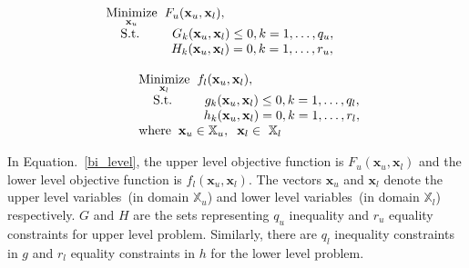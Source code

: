 \begin{equation}
\begin{array}{lr}
 \underset{\mathbf{x}_u}{\text{Minimize}}\hspace{2mm} F_u(\mathbf{x}_u, \mathbf{ x}_l), \hspace{2mm} \\ 
 \hspace{4mm}\text{S.t.}\hspace{9mm}G_k(\mathbf{x}_u, \mathbf{ x}_l) \le 0, k=1,\ldots,q_u, \hspace{2mm}\\
\hspace{18mm}H_k(\mathbf{x}_u, \mathbf{ x}_l) = 0, k=1,\ldots,r_u, \hspace{2mm}\\
\text{ }\\
\hspace{9mm} \underset{\mathbf{x}_l}{\text{Minimize}}\hspace{2mm} f_l(\mathbf{x}_u, \mathbf{ x}_l), \\
 \hspace{9mm} \hspace{4mm}\text{S.t.}\hspace{9mm}g_k(\mathbf{x}_u, \mathbf{ x}_l) \le 0, k=1,\ldots,q_l, \hspace{2mm}\\
\hspace{9mm}\hspace{18mm}h_k(\mathbf{x}_u, \mathbf{ x}_l) = 0, k=1,\ldots,r_l, \hspace{1mm}\\
\hspace{9mm} \text {where}\hspace{2mm}{\mathbf{x}_u \in \mathbb{X}_u}, \hspace{2mm}{\mathbf{x}_l \in \ \mathbb{X}_l}\\
\end{array}
\label{bi_level}
\end{equation}


In Equation.~\ref{bi_level}, the upper level objective function is $F_u(\mathbf{x}_u, \mathbf{ x}_l)$ and the lower level objective function is $f_l(\mathbf{x}_u, \mathbf{ x}_l)$. The vectors $\mathbf{x}_u$ and $\mathbf{x}_l$ denote the upper level variables~(in domain  $\mathbb{X}_u$) and lower level variables~(in domain $\mathbb{X}_l$) respectively. $G$ and $H$ are the sets representing $q_u$ inequality and $r_u$ equality constraints for upper level problem. Similarly, there are $q_l$ inequality constraints in $g$ and $r_l$  equality constraints in $h$ for the lower level problem. 

